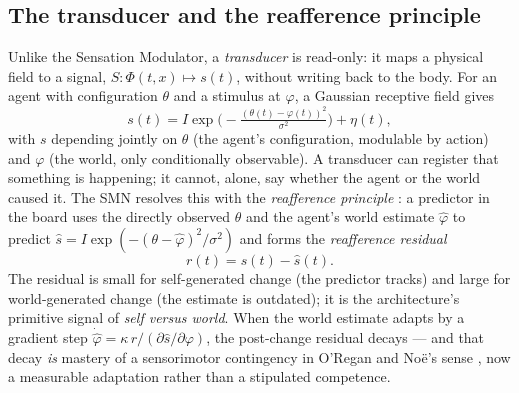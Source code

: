 \documentclass[utf8]{FrontiersinHarvard}
\begin{document}
\subsection{The transducer and the reafference principle}
Unlike the Sensation Modulator, a \emph{transducer} is read-only: it maps a physical field to a signal, $S:\Phi(t,x)\mapsto s(t)$, without writing back to the body. For an agent with configuration $\theta$ and a stimulus at $\varphi$, a Gaussian receptive field gives
\begin{equation}
s(t) = I\exp\!\Big(-\tfrac{(\theta(t)-\varphi(t))^2}{\sigma^2}\Big) + \eta(t), \label{eq:rf}
\end{equation}
with $s$ depending jointly on $\theta$ (the agent's configuration, modulable by action) and $\varphi$ (the world, only conditionally observable). A transducer can register that something is happening; it cannot, alone, say whether the agent or the world caused it. The SMN resolves this with the \emph{reafference principle} \citep{vonHolstMittelstaedt1950,CrapseSommer2008}: a predictor in the board uses the directly observed $\theta$ and the agent's world estimate $\hat\varphi$ to predict $\hat s = I\exp(-(\theta-\hat\varphi)^2/\sigma^2)$ and forms the \emph{reafference residual}
\begin{equation}
r(t) = s(t) - \hat s(t). \label{eq:residual}
\end{equation}
The residual is small for self-generated change (the predictor tracks) and large for world-generated change (the estimate is outdated); it is the architecture's primitive signal of \emph{self versus world}. When the world estimate adapts by a gradient step $\dot{\hat\varphi} = \kappa\,r/(\partial\hat s/\partial\varphi)$, the post-change residual decays --- and that decay \emph{is} mastery of a sensorimotor contingency in O'Regan and No\"e's sense \citep{OReganNoe2001Sensorimotor}, now a measurable adaptation rather than a stipulated competence.
\end{document}
